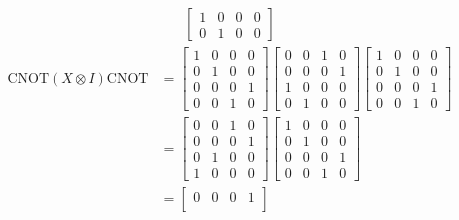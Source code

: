 \begin{examplebox}
\begin{equation*}
\begin{aligned}
\begin{bmatrix}
                1 & 0 & 0 & 0 \\
                0 & 1 & 0 & 0
            \end{bmatrix}
        \end{aligned}
    \end{equation*}
    \begin{equation}\label{eq:cnot-conjugation}
        \begin{aligned}
            \text{CNOT} (X \otimes I) \text{CNOT} &= \begin{bmatrix}
                1 & 0 & 0 & 0 \\
                0 & 1 & 0 & 0 \\
                0 & 0 & 0 & 1 \\
                0 & 0 & 1 & 0
            \end{bmatrix}
            \begin{bmatrix}
                0 & 0 & 1 & 0 \\
                0 & 0 & 0 & 1 \\
                1 & 0 & 0 & 0 \\
                0 & 1 & 0 & 0
            \end{bmatrix}
            \begin{bmatrix}
                1 & 0 & 0 & 0 \\
                0 & 1 & 0 & 0 \\
                0 & 0 & 0 & 1 \\
                0 & 0 & 1 & 0
            \end{bmatrix} \\
            &=
            \begin{bmatrix}
                0 & 0 & 1 & 0 \\
                0 & 0 & 0 & 1 \\
                0 & 1 & 0 & 0 \\
                1 & 0 & 0 & 0
            \end{bmatrix}
            \begin{bmatrix}
                1 & 0 & 0 & 0 \\
                0 & 1 & 0 & 0 \\
                0 & 0 & 0 & 1 \\
                0 & 0 & 1 & 0
            \end{bmatrix} \\
            &=
            \begin{bmatrix}
                0 & 0 & 0 & 1 \\

\end{bmatrix}
\end{aligned}
\end{equation}
\end{examplebox}
